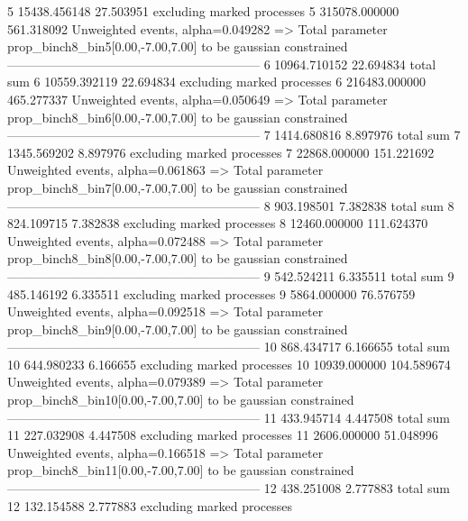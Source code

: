 5          15438.456148    27.503951       excluding marked processes    
5          315078.000000   561.318092      Unweighted events, alpha=0.049282
  => Total parameter prop_binch8_bin5[0.00,-7.00,7.00] to be gaussian constrained
------------------------------------------------------------
6          10964.710152    22.694834       total sum                     
6          10559.392119    22.694834       excluding marked processes    
6          216483.000000   465.277337      Unweighted events, alpha=0.050649
  => Total parameter prop_binch8_bin6[0.00,-7.00,7.00] to be gaussian constrained
------------------------------------------------------------
7          1414.680816     8.897976        total sum                     
7          1345.569202     8.897976        excluding marked processes    
7          22868.000000    151.221692      Unweighted events, alpha=0.061863
  => Total parameter prop_binch8_bin7[0.00,-7.00,7.00] to be gaussian constrained
------------------------------------------------------------
8          903.198501      7.382838        total sum                     
8          824.109715      7.382838        excluding marked processes    
8          12460.000000    111.624370      Unweighted events, alpha=0.072488
  => Total parameter prop_binch8_bin8[0.00,-7.00,7.00] to be gaussian constrained
------------------------------------------------------------
9          542.524211      6.335511        total sum                     
9          485.146192      6.335511        excluding marked processes    
9          5864.000000     76.576759       Unweighted events, alpha=0.092518
  => Total parameter prop_binch8_bin9[0.00,-7.00,7.00] to be gaussian constrained
------------------------------------------------------------
10         868.434717      6.166655        total sum                     
10         644.980233      6.166655        excluding marked processes    
10         10939.000000    104.589674      Unweighted events, alpha=0.079389
  => Total parameter prop_binch8_bin10[0.00,-7.00,7.00] to be gaussian constrained
------------------------------------------------------------
11         433.945714      4.447508        total sum                     
11         227.032908      4.447508        excluding marked processes    
11         2606.000000     51.048996       Unweighted events, alpha=0.166518
  => Total parameter prop_binch8_bin11[0.00,-7.00,7.00] to be gaussian constrained
------------------------------------------------------------
12         438.251008      2.777883        total sum                     
12         132.154588      2.777883        excluding marked processes    
